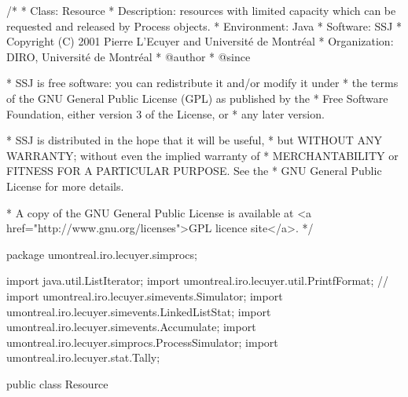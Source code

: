 \begin{code}
\begin{hide}
/*
 * Class:        Resource
 * Description:  resources with limited capacity which can be requested 
                 and released by Process objects.
 * Environment:  Java
 * Software:     SSJ 
 * Copyright (C) 2001  Pierre L'Ecuyer and Université de Montréal
 * Organization: DIRO, Université de Montréal
 * @author       
 * @since

 * SSJ is free software: you can redistribute it and/or modify it under
 * the terms of the GNU General Public License (GPL) as published by the
 * Free Software Foundation, either version 3 of the License, or
 * any later version.

 * SSJ is distributed in the hope that it will be useful,
 * but WITHOUT ANY WARRANTY; without even the implied warranty of
 * MERCHANTABILITY or FITNESS FOR A PARTICULAR PURPOSE.  See the
 * GNU General Public License for more details.

 * A copy of the GNU General Public License is available at
   <a href="http://www.gnu.org/licenses">GPL licence site</a>.
 */
\end{hide}
package umontreal.iro.lecuyer.simprocs;
\begin{hide}
import java.util.ListIterator;
import umontreal.iro.lecuyer.util.PrintfFormat;
// import umontreal.iro.lecuyer.simevents.Simulator;
import umontreal.iro.lecuyer.simevents.LinkedListStat;
import umontreal.iro.lecuyer.simevents.Accumulate;
import umontreal.iro.lecuyer.simprocs.ProcessSimulator;
import umontreal.iro.lecuyer.stat.Tally;
\end{hide}

public class Resource \begin{hide} {

   private static final int FIFO  = 1;
   private static final int LIFO  = 2;

        private ProcessSimulator sim;

        private String name;
        private int capacity = 0;
        private int available = 0;
        private int policy = FIFO;

        private LinkedListStat<UserRecord> serviceList;
        private LinkedListStat<UserRecord> waitingList;

        private boolean    stats = false;
        private double     initStatTime;
        private Accumulate statUtil;
        private Accumulate statCapacity;
        private Tally      statSojourn;
\end{hide}\end{code}

